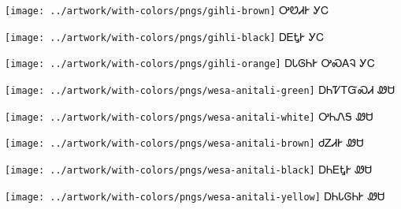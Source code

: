 \documentclass[avery5371]{flashcards}%
\begin{document}
    \begin{flashcard}{
        \texttt{[image: ../artwork/with-colors/pngs/gihli-brown]}
    }
        \Huge ᎤᏬᏗᎨ ᎩᏟ
    \end{flashcard}

    \begin{flashcard}{
        \texttt{[image: ../artwork/with-colors/pngs/gihli-black]}
    }
        \Huge ᎠᎬᎿᎨ ᎩᏟ
    \end{flashcard}

    \begin{flashcard}{
        \texttt{[image: ../artwork/with-colors/pngs/gihli-orange]}
    }
        \Huge ᎠᏓᎶᏂᎨ ᎤᏍᎪᎸ ᎩᏟ
    \end{flashcard}

    \begin{flashcard}{
        \texttt{[image: ../artwork/with-colors/pngs/wesa-anitali-green]}
    }
        \Huge ᎠᏂᏤᎢᏳᏍᏗ ᏪᏌ
    \end{flashcard}

    \begin{flashcard}{
        \texttt{[image: ../artwork/with-colors/pngs/wesa-anitali-white]}
    }
        \Huge ᎤᏂᏁᎦ ᏪᏌ
    \end{flashcard}

    \begin{flashcard}{
        \texttt{[image: ../artwork/with-colors/pngs/wesa-anitali-brown]}
    }
        \Huge ᏧᏃᏗᎨ ᏪᏌ
    \end{flashcard}

    \begin{flashcard}{
        \texttt{[image: ../artwork/with-colors/pngs/wesa-anitali-black]}
    }
        \Huge ᎠᏂᎬᎿᎨ ᏪᏌ
    \end{flashcard}

    \begin{flashcard}{
        \texttt{[image: ../artwork/with-colors/pngs/wesa-anitali-yellow]}
    }
        \Huge ᎠᏂᏓᎶᏂᎨ ᏪᏌ
    \end{flashcard}
\end{document}
